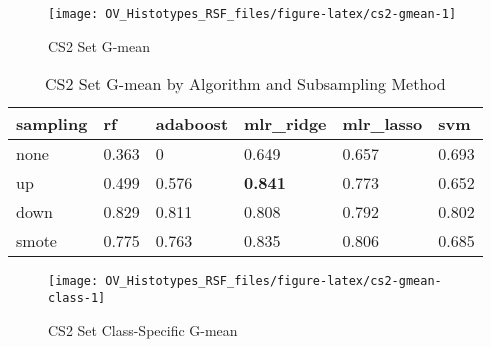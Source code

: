 \documentclass[
]{report}
\begin{document}
\begin{figure}[H]

{\centering \texttt{[image: OV\_Histotypes\_RSF\_files/figure-latex/cs2-gmean-1]} 

}

\caption{CS2 Set G-mean}\label{fig:cs2-gmean}
\end{figure}

\begin{table}

\caption{\label{tab:cs2-gmean-table}CS2 Set G-mean by Algorithm and Subsampling Method}
\centering
\begin{tabular}[t]{l|l|l|l|l|l}
\hline
sampling & rf & adaboost & mlr\_ridge & mlr\_lasso & svm\\
\hline
none & 0.363 & 0 & 0.649 & 0.657 & 0.693\\
\hline
up & 0.499 & 0.576 & \textbf{0.841} & 0.773 & 0.652\\
\hline
down & 0.829 & 0.811 & 0.808 & 0.792 & 0.802\\
\hline
smote & 0.775 & 0.763 & 0.835 & 0.806 & 0.685\\
\hline
\end{tabular}
\end{table}

\begin{figure}[H]

{\centering \texttt{[image: OV\_Histotypes\_RSF\_files/figure-latex/cs2-gmean-class-1]} 

}

\caption{CS2 Set Class-Specific G-mean}\label{fig:cs2-gmean-class}
\end{figure}
\end{document}
